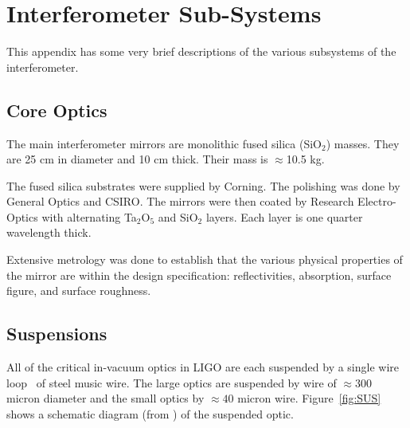 
\chapter{Interferometer Sub-Systems}
\label{app:SubSystems}

This appendix has some very brief descriptions of the various subsystems of the interferometer.

 
\section{Core Optics}

The main interferometer mirrors are monolithic fused silica (SiO$_2$) masses. They are
25 cm in diameter and 10 cm thick. Their mass is $\approx$10.5 kg.

The fused silica substrates were supplied by Corning. The polishing was done by General
Optics and CSIRO. The mirrors were then coated by Research Electro-Optics with alternating
Ta$_2$O$_5$ and SiO$_2$ layers. Each layer is one quarter wavelength thick.

Extensive metrology was done to establish that the various physical properties of the mirror
are within the design specification: reflectivities, absorption, surface figure, and surface
roughness.



\section{Suspensions}
\label{sec:SUS}
All of the critical in-vacuum optics in LIGO are each suspended by a single wire
loop~\cite{Fred:SuspensionLoss} of steel music wire. The large optics are 
suspended by wire of $\approx300$ micron diameter and the small optics
by $\approx40$ micron wire. Figure~\ref{fig:SUS} shows a schematic diagram
(from \cite{Gaby:Thermal}) of the suspended optic.

